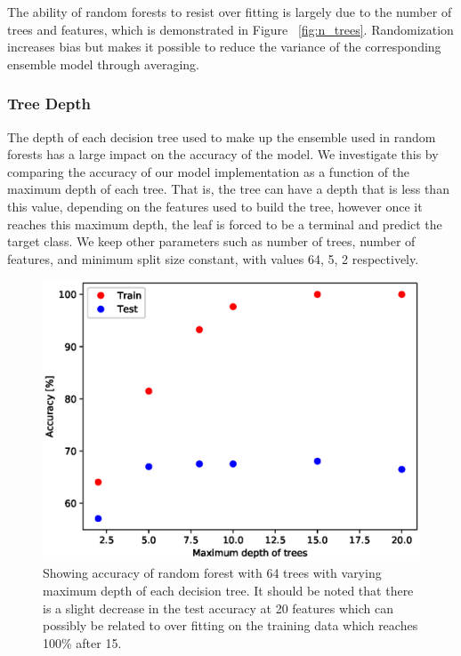 \documentclass{article} %
\begin{document}
The ability of random forests to resist over fitting is largely due to the number of trees and features, which is demonstrated in Figure ~\ref{fig:n_trees}. Randomization increases bias but makes it possible to reduce the variance of the corresponding ensemble model through averaging. \cite{formann-roe_2012}

\subsubsection{Tree Depth}

The depth of each decision tree used to make up the ensemble used in random forests has a large impact on the accuracy of the model. We investigate this by comparing the accuracy of our model implementation as a function of the maximum depth of each tree. That is, the tree can have a depth that is less than this value, depending on the features used to build the tree, however once it reaches this maximum depth, the leaf is forced to be a terminal and predict the target class. We keep other parameters such as number of trees, number of features, and minimum split size constant, with values 64, 5, 2 respectively.

\begin{figure}[ht]
\begin{center}
\includegraphics[scale=0.4]{max_depth}
\end{center}
\caption{Showing accuracy of random forest with 64 trees with varying maximum depth of each decision tree. It should be noted that there is a slight decrease in the test accuracy at 20 features which can possibly be related to over fitting on the training data which reaches 100\% after 15.}
\label{fig:max_depth}
\end{figure}
\end{document}
